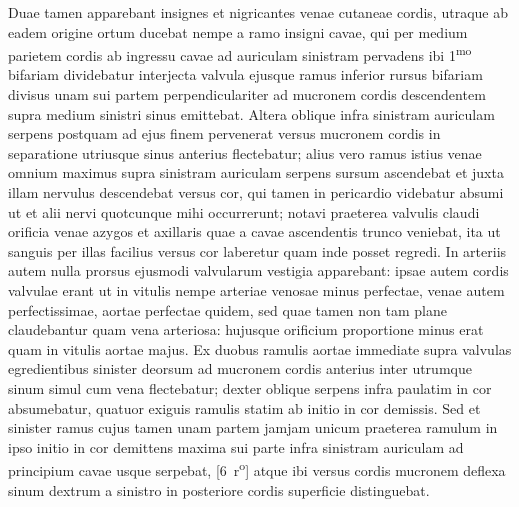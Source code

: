 Duae tamen apparebant insignes et nigricantes venae cutaneae cordis, utraque ab eadem origine ortum ducebat nempe a ramo insigni cavae, qui per medium parietem cordis ab ingressu cavae ad auriculam sinistram pervadens ibi 1\textsuperscript{mo} bifariam dividebatur interjecta valvula ejusque ramus inferior rursus bifariam divisus unam sui partem perpendiculariter ad mucronem cordis descendentem supra medium sinistri sinus emittebat. Altera oblique infra sinistram auriculam serpens postquam ad ejus finem pervenerat versus mucronem cordis in separatione utriusque sinus anterius flectebatur; alius vero ramus istius venae omnium maximus supra sinistram auriculam serpens sursum ascendebat et juxta illam nervulus descendebat versus cor, qui tamen in pericardio videbatur absumi ut et alii nervi quotcunque mihi occurrerunt; notavi praeterea valvulis claudi orificia venae azygos et axillaris quae a cavae ascendentis trunco veniebat, ita ut sanguis per illas facilius versus cor laberetur quam inde posset regredi. In arteriis autem nulla prorsus ejusmodi valvularum vestigia apparebant: ipsae autem cordis valvulae erant ut in vitulis nempe
arteriae venosae minus perfectae, venae autem perfectissimae, aortae perfectae quidem, sed quae tamen non tam plane claudebantur quam vena arteriosa: hujusque orificium proportione minus erat quam in vitulis aortae majus.
\pend%
\pstart%
Ex duobus ramulis aortae immediate supra valvulas egredientibus sinister deorsum ad mucronem cordis anterius inter utrumque sinum simul cum vena flectebatur; dexter oblique serpens infra
paulatim in cor absumebatur, quatuor exiguis ramulis statim ab initio in cor demissis.
Sed et sinister ramus cujus tamen unam partem
\pend
\newpage
\pstart\noindent jamjam 
unicum praeterea ramulum in ipso initio in cor demittens maxima sui parte infra sinistram auriculam ad principium cavae usque serpebat,
[6~r\textsuperscript{o}]
atque ibi versus cordis mucronem deflexa sinum dextrum a sinistro in posteriore cordis superficie distinguebat.
\pend%
